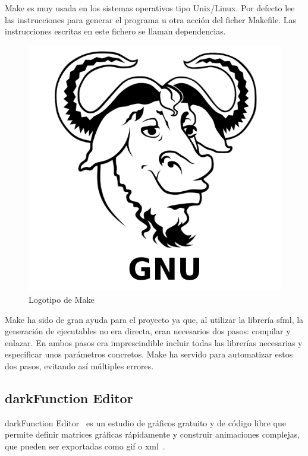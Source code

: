 		Make es muy usada en los sistemas operativos tipo Unix/Linux. Por defecto lee las instrucciones para generar el programa u otra acción del ficher Makefile. Las instrucciones escritas en este fichero se llaman dependencias.

		\begin{figure}[!htp]
			 \centering
			 \includegraphics[scale=.25]{fig/make}
			 \caption{Logotipo de Make}
			 \label{fig:make}
		\end{figure}

		\FloatBarrier

		Make ha sido de gran ayuda para el proyecto ya que, al utilizar la librería \acrshort{sfml}, la generación de ejecutables no era directa, eran necesarios dos pasos: compilar y enlazar. En ambos pasos era imprescindible incluir todas las librerías necesarias y especificar unos parámetros concretos. Make ha servido para automatizar estos dos pasos, evitando así múltiples errores.

	\subsection{darkFunction Editor}

		darkFunction Editor~\cite{dark} es un estudio de gráficos gratuito y de código libre que permite definir matrices gráficas rápidamente y construir animaciones complejas, que pueden ser exportadas como \acrshort{gif} o \acrshort{xml}~\cite{xml}.

